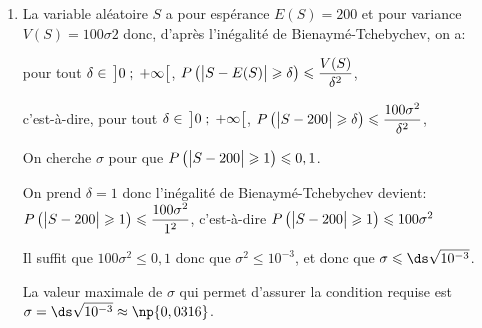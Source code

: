 \begin{enumerate}
\begin{enumerate}
$\begin{aligned}[t]
199 < S < 201 
& \iff 199-200 < S - 200 < 201-200
\iff -1 < S-200 < 1\\
& \iff \left | S-200 \strut \right |<1
\end{aligned}$

Donc $P \left ( 199 < S < 201  \right ) = P \left ( \left | S-200 \strut \right |<1\right )$

En prenant l'événement contraire: 

$P \left ( \left | S-200 \strut \right |<1\right ) > 0,9
\iff P \left ( \left |S-200 \strut \right | \geqslant 1 \right ) \leqslant 0,1$

\item
La variable aléatoire $S$ a pour espérance $E(S)=200$ et pour variance $V(S)=100\sigma2$ donc, d'après l'inégalité de Bienaymé-Tchebychev, on a:

pour tout $\delta\in\, \left ]0\;;\;+\infty\strut \right [$, $P\left ( \left |S-E(S)\strut \right | \geqslant \delta \right ) \leqslant \dfrac{V(S)}{\delta^2}$, 

c'est-à-dire,
pour tout $\delta\in\, \left ]0\;;\;+\infty\strut \right [$, $P\left ( \left |S-200\strut \right | \geqslant \delta \right ) \leqslant \dfrac{100\sigma^2}{\delta^2}$, 

On cherche $\sigma$ pour que
$P \left ( \left |S-200 \strut \right | \geqslant 1 \right ) \leqslant 0,1$.

On prend $\delta=1$ donc l'inégalité de Bienaymé-Tchebychev devient:\\
$P\left ( \left |S-200\strut \right | \geqslant 1 \right ) \leqslant \dfrac{100\sigma^2}{1^2}$, c'est-à-dire
$P\left ( \left |S-200\strut \right | \geqslant 1 \right ) \leqslant 100\sigma^2$

Il suffit  que $100\sigma^2 \leqslant 0,1$ donc que $\sigma^2 \leqslant 10^{-3}$, et donc que $\sigma \leqslant \ds\sqrt{10^{-3}}$.

La valeur maximale de $\sigma$ qui permet d'assurer la condition requise est\\
 $\sigma= \ds \sqrt{10^{-3}}\approx \np{0,0316}$. 
	\end{enumerate}
\end{enumerate}
